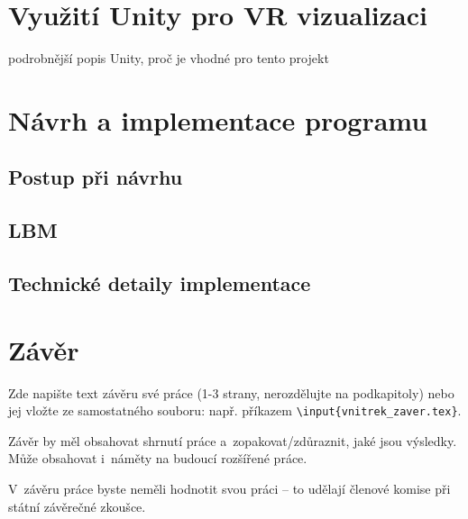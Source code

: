 \documentclass[a4paper,oneside,12pt]{book}
\begin{document}
%

%


\chapter{Využití Unity pro VR vizualizaci}
podrobnější popis Unity, proč je vhodné pro tento projekt

\chapter{Návrh a implementace programu}
\section{Postup při návrhu}

\section{LBM}

\section{Technické detaily implementace}

\chapter*{Závěr}
%
Zde napište text závěru své práce (1-3 strany, nerozdělujte na podkapitoly) nebo jej vložte ze samostatného souboru: např. příkazem \texttt{\textbackslash input\{vnitrek\_zaver.tex\}}. \par Závěr by měl obsahovat shrnutí práce a~zopakovat/zdůraznit, jaké jsou výsledky. Může obsahovat i~náměty na budoucí rozšířené práce. \par V~závěru práce byste neměli hodnotit svou práci -- to udělají členové komise při státní závěrečné zkoušce.
%
%
\end{document}
